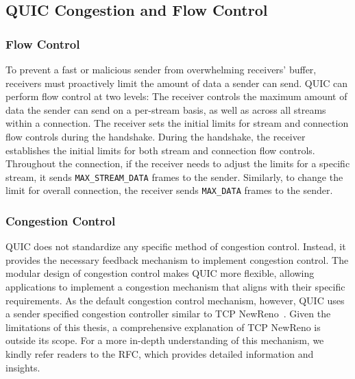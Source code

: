 \subsection{QUIC Congestion and Flow Control}
\subsubsection{Flow Control}
To prevent a fast or malicious sender from overwhelming receivers' buffer, receivers must proactively limit the amount of data a sender can send.
QUIC can perform flow control at two levels: The receiver controls the maximum amount of data the sender can send on a per-stream basis, as well as across all streams within a connection. 
The receiver sets the initial limits for stream and connection flow controls during the handshake. 
During the handshake, the receiver establishes the initial limits for both stream and connection flow controls. Throughout the connection, if the receiver needs to adjust the limits for a specific stream, it sends \texttt{MAX\_STREAM\_DATA} frames to the sender.
Similarly, to change the limit for overall connection, the receiver sends \texttt{MAX\_DATA} frames to the sender.

\subsubsection{Congestion Control}
QUIC does not standardize any specific method of congestion control.
Instead, it provides the necessary feedback mechanism to implement congestion control.
The modular design of congestion control makes QUIC more flexible, allowing applications to implement a congestion mechanism that aligns with their specific requirements.
As the default congestion control mechanism, however, QUIC uses a sender specified congestion controller similar to TCP NewReno~\cite{rfc6582}.
Given the limitations of this thesis, a comprehensive explanation of TCP NewReno is outside its scope.
For a more in-depth understanding of this mechanism, we kindly refer readers to the RFC, which provides detailed information and insights.
